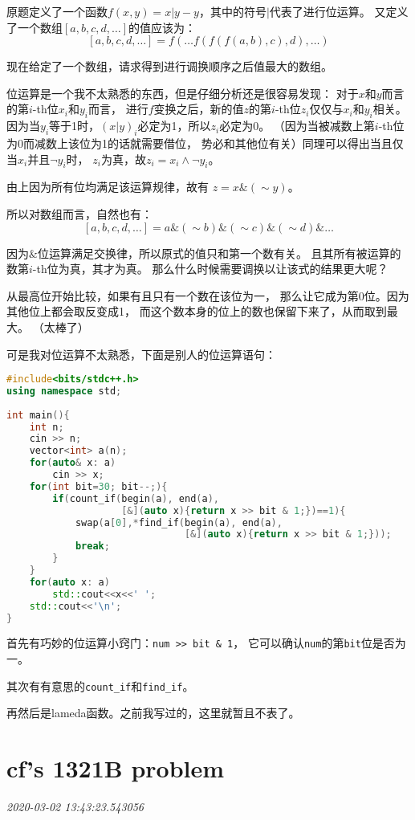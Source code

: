 \documentclass{peterlitsdoc}
\newcommand{\timetx}[1]
    {\par\noindent\emph{\pltgray\small #1}\vspace{2em}}
\newcommand{\vb}{\verb}
\begin{document}
原题定义了一个函数$f(x, y)=x|y-y$，其中的符号$|$代表了进行位运算。
又定义了一个数组$[a, b, c, d, \ldots]$的值应该为：
$$[a, b, c, d, \ldots] = f(\ldots f(f(f(a, b), c), d), \ldots)$$

现在给定了一个数组，请求得到进行调换顺序之后值最大的数组。

位运算是一个我不太熟悉的东西，但是仔细分析还是很容易发现：
对于$x$和$y$而言的第$i$-th位$x_i$和$y_i$而言，
进行$f$变换之后，新的值$z$的第$i$-th位$z_i$仅仅与$x_i$和$y_i$相关。
因为当$y_i$等于1时，$(x|y)_i$必定为1，所以$z_i$必定为0。
（因为当被减数上第$i$-th位为0而减数上该位为1的话就需要借位，
势必和其他位有关）同理可以得出当且仅当$x_i$并且$\lnot y_i$时，
$z_i$为真，故$z_i=x_i\land\lnot y_i$。

由上因为所有位均满足该运算规律，故有
$z=x\&(\sim y)$。

所以对数组而言，自然也有：
$$[a, b, c, d, \ldots] = a\&(\sim b)\&(\sim c)\&(\sim d)\&\ldots$$

因为$\&$位运算满足交换律，所以原式的值只和第一个数有关。
且其所有被运算的数第$i$-th位为真，其才为真。
那么什么时候需要调换以让该式的结果更大呢？

从最高位开始比较，如果有且只有一个数在该位为一，
那么让它成为第0位。因为其他位上都会取反变成1，
而这个数本身的位上的数也保留下来了，从而取到最大。
（太棒了）

可是我对位运算不太熟悉，下面是别人的位运算语句：
\begin{lstlisting}[language=C++]
#include<bits/stdc++.h>
using namespace std;
 
int main(){
    int n;
    cin >> n;
    vector<int> a(n);
    for(auto& x: a)
        cin >> x;
    for(int bit=30; bit--;){
        if(count_if(begin(a), end(a),
                    [&](auto x){return x >> bit & 1;})==1){
            swap(a[0],*find_if(begin(a), end(a),
                               [&](auto x){return x >> bit & 1;}));
            break;
        }
    }
    for(auto x: a)
        std::cout<<x<<' ';
    std::cout<<'\n';
}
\end{lstlisting}

首先有巧妙的位运算小窍门：\vb|num >> bit & 1|，
它可以确认\vb|num|的第\vb|bit|位是否为一。

其次有有意思的\vb|count_if|和\vb|find_if|。

再然后是lameda函数。之前我写过的，这里就暂且不表了。


\section{cf's 1321B problem}\timetx{2020-03-02 13:43:23.543056}
\end{document}
